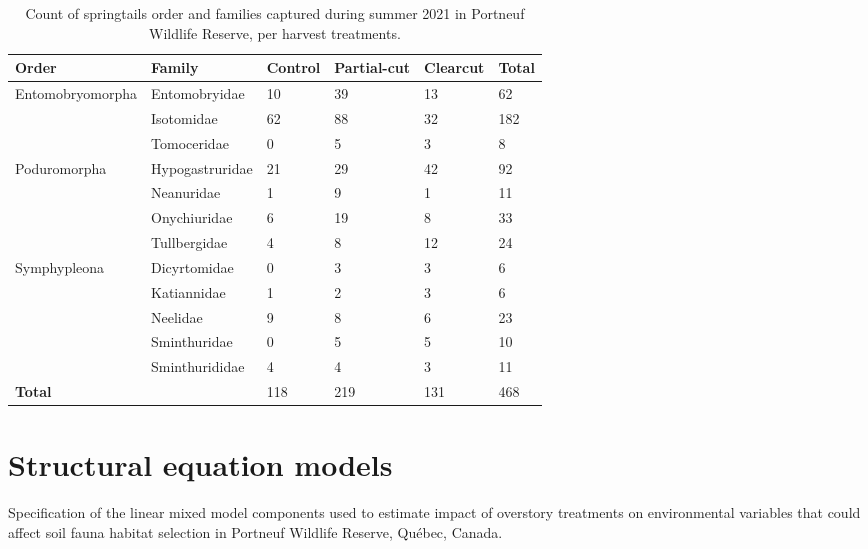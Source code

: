   \begin{table}[ht]
    \centering
    \caption[Count of springtails order and families, per harvest treatments]
    {Count of springtails order and families captured during summer 2021 in Portneuf Wildlife Reserve, per harvest treatments.}
    \label{tab:springtail}
    \begin{tabular}{llllll} 
        \hline
        Order & Family & Control & Partial-cut & Clearcut & Total \\ [0.5ex] 
        \hline      
        Entomobryomorpha    & Entomobryidae     & 10 & 39 & 13 & 62 \\  
                            & Isotomidae        & 62 & 88 & 32 & 182 \\
                            & Tomoceridae       & 0 & 5 & 3 & 8 \\
        Poduromorpha        & Hypogastruridae   & 21 & 29 & 42 & 92 \\
                            & Neanuridae        & 1 & 9 & 1 & 11 \\
                            & Onychiuridae      & 6 & 19 & 8 & 33 \\
                            & Tullbergidae      & 4 & 8 & 12 & 24 \\
        Symphypleona        & Dicyrtomidae      & 0 & 3 & 3 & 6 \\
                            & Katiannidae       & 1 & 2 & 3 & 6 \\
                            & Neelidae          & 9 & 8 & 6 & 23 \\
                            & Sminthuridae      & 0 & 5 & 5 & 10 \\
                            & Sminthurididae    & 4 & 4 & 3 & 11 \\
                            \hline 
        \textbf{Total}      &                   & 118 & 219 & 131 & 468 \\
        \hline
    \end{tabular}
  \end{table}

  \clearpage

\section{Structural equation models}


\begin{table}[h!]
\caption[Specification of the linear mixed model components used to estimate impact of overstory treatments on environmental variables that could affect soil fauna habitat selection.]
{Specification of the linear mixed model components used to estimate impact of overstory treatments on environmental variables that could affect soil fauna habitat selection in Portneuf Wildlife Reserve, Québec, Canada.}
\label{ann:SEM_Env_eq}
\end{table}


